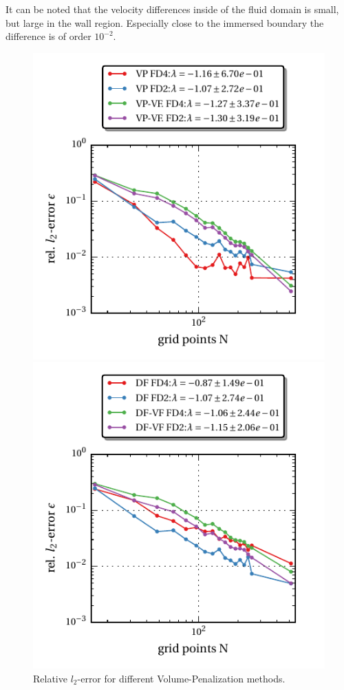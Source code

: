 It can be noted that the velocity differences inside of the fluid domain is small, but large in the wall region.
Especially close to the immersed boundary the difference  is of order $10^{-2}$.
\clearpage
\begin{figure}[!bp]
  \begin{minipage}[c]{0.5\textwidth}
      \includegraphics{gfx/immersed_boundary/tcflow/theo/vp.pdf}
      \caption{Relative $l_2$-error for different Volume-Penalization methods.}
      \label{vali:tc_flow_gc_vp}
  \end{minipage}
  \begin{minipage}[c]{0.5\textwidth}
      \includegraphics{gfx/immersed_boundary/tcflow/theo/df.pdf}

\end{minipage}
\end{figure}
